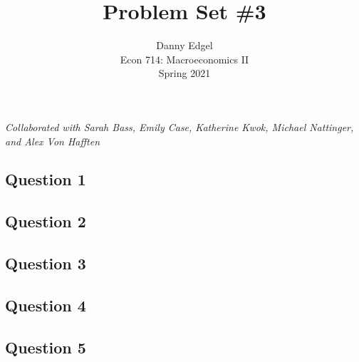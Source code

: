 \documentclass{article}
\begin{document}
\title{	Problem Set \#3 }
\author{ 	Danny Edgel 					\\ 
			Econ 714: Macroeconomics II		\\
			Spring 2021						\\
		}
\maketitle\thispagestyle{empty}


\noindent\textit{Collaborated with Sarah Bass, Emily Case, Katherine Kwok, Michael Nattinger, and Alex Von Hafften}


\subsection*{Question 1}




\subsection*{Question 2}




\subsection*{Question 3}




\subsection*{Question 4}




\subsection*{Question 5}
\end{document}

